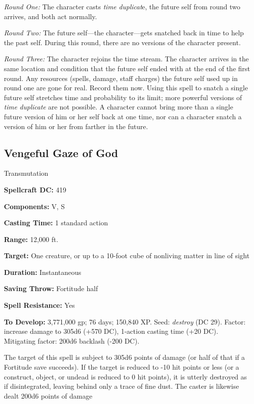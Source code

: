 \documentclass{article}
\begin{document}
\textit{Round One: }The character casts \textit{time duplicat}e, the future self 
from round two arrives, and both act normally. 

\textit{Round Two: }The future self---the character---gets snatched back in time 
to help the past self. During this round, there are no versions of the character 
present. 

\textit{Round Three: }The character rejoins the time stream. The character arrives 
in the same location and condition that the future self ended with at the end of 
the first round. Any resources (spells, damage, staff charges) the future self 
used up in round one are gone for real. Record them now. Using this spell to snatch 
a single future self stretches time and probability to its limit; more powerful 
versions of \textit{time duplicate }are not possible. A character cannot bring 
more than a single future version of him or her self back at one time, nor can 
a character snatch a version of him or her from farther in the future. 

\vspace{12pt}
\subsection*{Vengeful Gaze of God }

Transmutation 

\textbf{Spellcraft DC:} 419 

\textbf{Components:} V, S 

\textbf{Casting Time:} 1 standard action 

\textbf{Range:} 12,000 ft. 

\textbf{Target:} One creature, or up to a 10-foot cube of nonliving matter in line 
of sight 

\textbf{Duration:} Instantaneous 

\textbf{Saving Throw:} Fortitude half 

\textbf{Spell Resistance:} Yes 

\textbf{To Develop:} 3,771,000 gp; 76 days; 150,840 XP. Seed: \textit{destroy }(DC 
29). Factor: increase damage to 305d6 (+570 DC), 1-action casting time (+20 DC). 
Mitigating factor: 200d6 backlash (-200 DC). 

The target of this spell is subject to 305d6 points of damage (or half of that 
if a Fortitude save succeeds). If the target is reduced to -10 hit points or less 
(or a construct, object, or undead is reduced to 0 hit points), it is utterly destroyed 
as if disintegrated, leaving behind only a trace of fine dust. The caster is likewise 
dealt 200d6 points of damage
\end{document}
